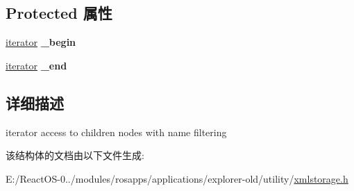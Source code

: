 \subsection*{Protected 属性}
\begin{DoxyCompactItemize}
\item 
\mbox{\label{struct_x_m_l_storage_1_1_x_m_l_children_filter_aeac95887eadecc529bd5f352c3132b81}} 
\hyperlink{struct_x_m_l_storage_1_1_x_m_l_children_filter_1_1iterator}{iterator} {\bfseries \+\_\+begin}
\item 
\mbox{\label{struct_x_m_l_storage_1_1_x_m_l_children_filter_accca44a44058e38f1936cf3f1424894a}} 
\hyperlink{struct_x_m_l_storage_1_1_x_m_l_children_filter_1_1iterator}{iterator} {\bfseries \+\_\+end}
\end{DoxyCompactItemize}


\subsection{详细描述}
iterator access to children nodes with name filtering 

该结构体的文档由以下文件生成\+:\begin{DoxyCompactItemize}
\item 
E\+:/\+React\+O\+S-\/0../modules/rosapps/applications/explorer-\/old/utility/\hyperlink{xmlstorage_8h}{xmlstorage.\+h}\end{DoxyCompactItemize}
